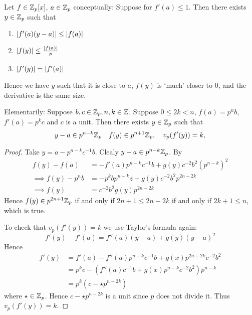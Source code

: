 \begin{prop}
    Let $f \in \mathbb{Z}_p[x]$, $a \in \mathbb{Z}_p$
    conceptually:
    Suppose for $f'(a) \le 1$.
    Then there exists $y \in \mathbb{Z}_p$ such that
    \begin{enumerate}
        \item $\left\vert f'(a)(y - a) \right\vert \le \left\vert f(a) \right\vert$
        \item $\left\vert f(y) \right\vert \le \frac{\left\vert f(a) \right\vert}{p}$
        \item $\left\vert f'(y) \right\vert = \left\vert f'(a) \right\vert$
    \end{enumerate}
    Hence we have $y$ such that it is close to $a$,
    $f(y)$ is `much' closer to $0$, 
    and the derivative is the same size.

    Elementarily:
    Suppose $b,c \in \mathbb{Z}_p, n, k \in \mathbb{Z}$.
    Suppose $0 \le 2k < n$, $f(a) = p^n b$, $f'(a) = p^{k} c$ 
    and $c$ is a unit.
    Then there exists $y \in \mathbb{Z}_p$ such that 
    \[
        y - a \in p^{n-k} \mathbb{Z}_p \quad
        f(y) \in p^{n+1} \mathbb{Z}_p, \quad v_p(f'(y)) = k, 
    \]
\end{prop}
\begin{proof}
    Take $y = a - p^{n-k} c^{-1} b$.
    Clealy $y - a \in p^{n-k} \mathbb{Z}_p $.
    By 
    \begin{align*}
        f(y) - f(a) &=  
        - f'(a) p^{n-k} c^{-1} b + g(y) c^{-2} b^2 (p^{n-k})^2\\
        \implies f(y) - p^n b &= - p^{k} b p^{n-k} z + 
        g(y) c^{-2} b^2 p^{2n - 2k}\\
        \implies f(y) &= c^{-2} b^2 g(y) p^{2n - 2k}
    \end{align*}
    Hence $f(y) \in p^{2n + 1} \mathbb{Z}_p$ if and only if
    $2n + 1 \le 2n - 2k$ if and only if $2k + 1 \le n$,
    which is true.

    To check that  $v_p(f'(y)) = k$ we use Taylor's formula again:
    \[f'(y) - f'(a) = f''(a)(y - a) + g(y) (y - a)^2\]
    Hence 
    \begin{align*}
        f'(y) &= 
        f'(a) - f''(a) p^{n-k} c^{-1} b + g(x)p^{2n-2k}c^{-2}b^2\\
        &= p^k c - (f''(a) c^{-1} b + g(x)p^{n-k}c^{-2}b^2)p^{n-k}\\
        &= p^k (c - \star p^{n-2k})
    \end{align*}
    where $\star \in \mathbb{Z}_p$.
    Hence $c - \star p^{n-2k}$ is a unit since $p$ does not divide it.
    Thus $v_p(f'(y)) = k$. 
\end{proof}

